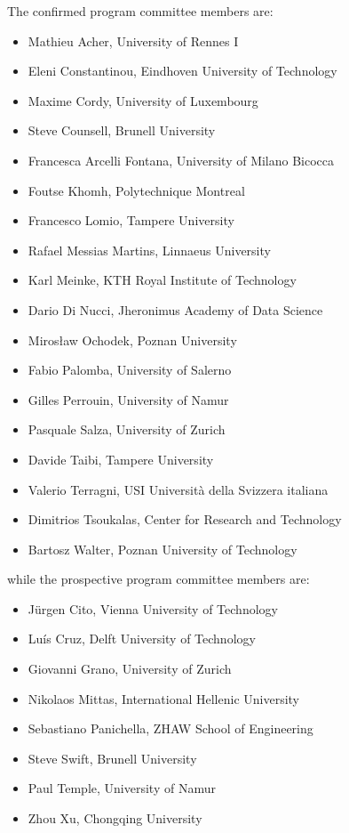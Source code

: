 \medskip
\noindent The confirmed program committee members are:
\begin{itemize}[topsep=0.5em, itemsep=0.5em]
  \item Mathieu Acher, University of Rennes I
  \item Eleni Constantinou, Eindhoven University of Technology
  \item Maxime Cordy, University of Luxembourg
  \item Steve Counsell, Brunell University
  \item Francesca Arcelli Fontana, University of Milano Bicocca
  \item Foutse Khomh, Polytechnique Montreal
  \item Francesco Lomio, Tampere University
  \item Rafael Messias Martins, Linnaeus University
  \item Karl Meinke, KTH Royal Institute of Technology
  \item Dario Di Nucci, Jheronimus Academy of Data Science
  \item Mirosław Ochodek, Poznan University
  \item Fabio Palomba, University of Salerno
  \item Gilles Perrouin, University of Namur
  \item Pasquale Salza, University of Zurich
  \item Davide Taibi, Tampere University
  \item Valerio Terragni, USI Università della Svizzera italiana
  \item Dimitrios Tsoukalas, Center for Research and Technology
  \item Bartosz Walter, Poznan University of Technology
\end{itemize}

\smallskip
\noindent while the prospective program committee members are:
\begin{itemize}[topsep=0.5em, itemsep=0.5em]
  \item Jürgen Cito, Vienna University of Technology
  \item Luís Cruz, Delft University of Technology
  \item Giovanni Grano, University of Zurich
  \item Nikolaos Mittas, International Hellenic University
  \item Sebastiano Panichella, ZHAW School of Engineering
  \item Steve Swift, Brunell University
  \item Paul Temple, University of Namur
  \item Zhou Xu, Chongqing University
\end{itemize}
